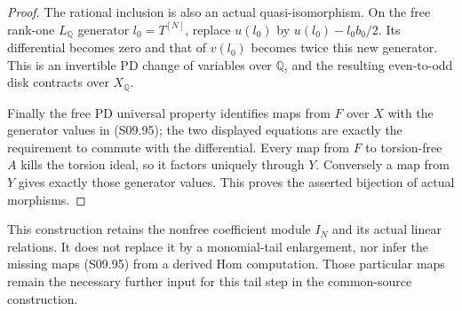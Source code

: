\begin{proof}
The rational inclusion is also an actual
quasi-isomorphism.  On the free rank-one
$L_{\mathbb Q}$ generator $l_0=T^{[N]}$, replace
$u(l_0)$ by $u(l_0)-l_0b_0/2$.
Its differential becomes zero and that of
$v(l_0)$ becomes twice this new generator.
This is an invertible PD change of variables
over $\mathbb Q$, and the resulting even-to-odd
disk contracts over $X_{\mathbb Q}$.

Finally the free PD universal property identifies
maps from $F$ over $X$ with the generator values
in (S09.95); the two displayed equations are
exactly the requirement to commute with the
differential.  Every map from $F$ to torsion-free
$A$ kills the torsion ideal, so it factors uniquely
through $Y$.  Conversely a map from $Y$ gives
exactly those generator values.  This proves
the asserted bijection of actual morphisms.
\end{proof}

This construction retains the nonfree coefficient
module $I_N$ and its actual linear relations.  It
does not replace it by a monomial-tail enlargement,
nor infer the missing maps (S09.95) from a derived
Hom computation.  Those particular maps remain
the necessary further input for this tail step
in the common-source construction.

